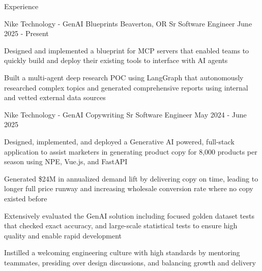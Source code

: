 \documentclass{resume}
\begin{document}
\begin{rSection}{Experience}

\begin{rSubsection}{Nike Technology - GenAI Blueprints}
                   {Beaverton, OR}
                   {Sr Software Engineer}
                   {June 2025 - Present}
    \item Designed and implemented a blueprint for MCP servers that enabled teams
          to quickly build and deploy their existing tools to interface with AI agents
    \item Built a multi-agent deep research POC using LangGraph that autonomously researched
          complex topics and generated comprehensive reports using internal and vetted external data sources
\vspace{-2mm}
\end{rSubsection}


\begin{rSubsection}{Nike Technology - GenAI Copywriting}
                   {}
                   {Sr Software Engineer}
                   {May 2024 - June 2025}
    \item Designed, implemented, and deployed a Generative AI powered, full-stack application
          to assist marketers in generating product copy for 8,000 products per season using NPE, Vue.js, and FastAPI
    \item Generated \$24M in annualized demand lift by delivering copy on time, leading to
          longer full price runway and increasing wholesale conversion rate where no copy existed before
    \item Extensively evaluated the GenAI solution including focused golden dataset tests that checked exact
          accuracy, and large-scale statistical tests to ensure high quality and enable rapid development
    \item Instilled a welcoming engineering culture with high standards by mentoring teammates,
          presiding over design discussions, and balancing growth and delivery
\vspace{-2mm}
\end{rSubsection}



\end{rSection}
\end{document}
